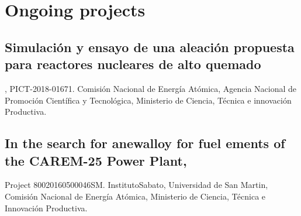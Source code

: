 \section{Ongoing projects}

\subsection{
  Simulación y ensayo de una aleación propuesta para reactores nucleares de alto quemado
}, PICT-2018-01671. Comisión Nacional de Energía Atómica, Agencia Nacional de Promoción Científica y 
Tecnológica, Ministerio de Ciencia, Técnica e innovación Productiva. 


\subsection{In the search for anewalloy for fuel ements of the CAREM-25 Power Plant, }Project 80020160500046SM. InstitutoSabato, Universidad de San Martin, Comisión Nacional de Energía Atómica, Ministerio de Ciencia, Técnica e Innovación Productiva.

